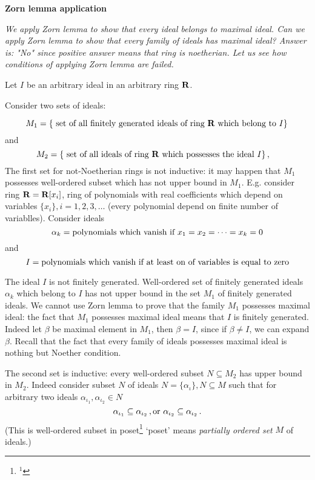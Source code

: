 
\def\R {{\bf R}}
\def\a {\alpha}




   \centerline {\bf Zorn lemma application}

{\it
  We apply Zorn lemma to show that every ideal belongs to maximal ideal.
Can we apply Zorn lemma to show that every family of ideals
has maximal ideal?  Answer is: "No" since positive answer means that ring is 
noetherian. Let us see how conditions of applying Zorn lemma are failed.}


  Let $I$ be an arbitrary ideal in an arbitrary ring $\R$.

   Consider two sets of ideals:

      $$
   M_1=\{\hbox{
set of all finitely generated ideals of ring $\R$ which 
belong to $I$}\}\,
      $$
and
      $$
   M_2=\{\hbox{
set of all ideals of ring $\R$ which possesses the ideal $I$}\}\,,\quad
      $$
 The first set for not-Noetherian rings is not inductive: it may happen
that $M_1$ possesses
well-ordered subset which has not upper bound in $M_1$.
E.g.  consider ring $\R=\R[x_i]$, 
ring of polynomials with real coefficients
which depend on variables 
$\{x_i\}, i=1,2,3,\dots$ 
(every polynomial depend on finite number of variablles). Consider ideals
   $$
  \a_k=\hbox {polynomials which vanish if $x_1=x_2=\dots=x_k=0$}
   $$
and
      $$
   I=\hbox{polynomials which vanish if at least on of variables is 
equal to zero}
      $$

 The ideal $I$ is not finitely generated. Well-ordered 
set of finitely generated
ideals $\a_k$ which belong to $I$ has not upper bound
in the set $M_1$ of finitely generated ideals. We cannot use Zorn lemma
to prove that the family $M_1$ possesses maximal ideal:
the fact that $M_1$ possesses maximal ideal means that $I$ is finitely 
generated. Indeed let $\beta$ be maximal element in $M_1$, then $\beta=I$,
since if $\beta\not=I$, we can expand $\beta$. 
{Recall that the fact that every family of ideals possesses maximal ideal
is nothing but Noether condition.}




  The second set is inductive: every well-ordered subset $N\subseteq M_2$
has upper bound in $M_2$. Indeed consider subset $N$
 of ideals $N=\{\a_\iota\}, N\subseteq M$
such that for arbitrary two ideals $\a_{\iota_1},\a_{\iota_2}\in N$
              $$
        \a_{\iota_1}\subseteq \a_{\iota_2}\,,{\rm or}\,\,
        \a_{\iota_2}\subseteq \a_{\iota_2}\,.
              $$
(This is well-ordered subset in poset\footnote{$^{1}$}
  {`poset' means {\it partially ordered set}} $M$ of ideals.)


